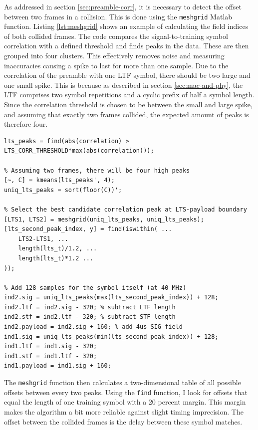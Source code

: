 As addressed in section \ref{sec:preamble-corr}, it is necessary to detect the offset between two frames in a collision. This is done using the \texttt{meshgrid} Matlab function. Listing \ref{lst:meshgrid} shows an example of calculating the field indices of both collided frames. The code compares the signal-to-training symbol correlation with a defined threshold and finds peaks in the data. These are then grouped into four clusters. This effectively removes noise and measuring inaccuracies causing a spike to last for more than one sample. Due to the correlation of the preamble with one \gls{LTF} symbol, there should be two large and one small spike. This is because as described in section \ref{sec:mac-and-phy}, the \gls{LTF} comprises two symbol repetitions and a cyclic prefix of half a symbol length. Since the correlation threshold is chosen to be between the small and large spike, and assuming that exactly two frames collided, the expected amount of peaks is therefore four.

\begin{lstlisting}[captionpos=b,caption={Collision Offset Detection using Meshgrid},label=lst:meshgrid]
% Find peaks above a parametrized threshold
lts_peaks = find(abs(correlation) > LTS_CORR_THRESHOLD*max(abs(correlation)));

% Assuming two frames, there will be four high peaks
[~, C] = kmeans(lts_peaks', 4);
uniq_lts_peaks = sort(floor(C))';

% Select the best candidate correlation peak at LTS-payload boundary
[LTS1, LTS2] = meshgrid(uniq_lts_peaks, uniq_lts_peaks);
[lts_second_peak_index, y] = find(iswithin( ...
    LTS2-LTS1, ...
    length(lts_t)/1.2, ...
    length(lts_t)*1.2 ...
));

% Add 128 samples for the symbol itself (at 40 MHz)
ind2.sig = uniq_lts_peaks(max(lts_second_peak_index)) + 128;
ind2.ltf = ind2.sig - 320; % subtract LTF length
ind2.stf = ind2.ltf - 320; % subtract STF length
ind2.payload = ind2.sig + 160; % add 4us SIG field
ind1.sig = uniq_lts_peaks(min(lts_second_peak_index)) + 128;
ind1.ltf = ind1.sig - 320;
ind1.stf = ind1.ltf - 320;
ind1.payload = ind1.sig + 160;
\end{lstlisting}

The \texttt{meshgrid} function then calculates a two-dimensional table of all possible offsets between every two peaks. Using the \texttt{find} function, I look for offsets that equal the length of one training symbol with a 20 percent margin. This margin makes the algorithm a bit more reliable against slight timing imprecision. The offset between the collided frames is the delay between these symbol matches.

